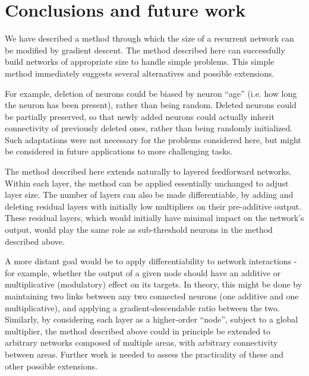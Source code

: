 \documentclass{article}
\begin{document}
\section{Conclusions and future work}

We have described a method through which the size of a recurrent network can be
modified by gradient descent. The method described here can successfully build
networks of appropriate size to handle simple problems. This simple method
immediately suggests several alternatives and possible extensions.

For example, deletion of neurons could be biased by neuron ``age'' (i.e. how
long the neuron has been present), rather than being random. Deleted neurons
could be partially preserved, so that newly added neurons could actually
inherit connectivity of previously deleted ones, rather than being randomly
initialized. Such adaptations were not necessary for the problems considered
here, but might be considered in future applications to more challenging tasks.

The method described here extends naturally to layered feedforward networks.
Within each layer, the method can be applied essentially unchanged to adjust
layer size. The number of layers can also be made differentiable, by adding and deleting
residual layers \cite{He2015-gk} with initially low multipliers on their
pre-additive output. These residual layers, which would initially have minimal impact
on the network's output, would play the same role as sub-threshold neurons in
the method described above.


A more distant goal would be to  apply differentiability to network
interactions - for example, whether the output of a given node should have an
additive or multiplicative (modulatory) effect on its targets. In theory, this
might be done by maintaining two links between any two connected neurons (one
additive and one multiplicative), and applying a gradient-descendable ratio
between the two.  Similarly, by considering each layer as a higher-order
``node'', subject to a global multiplier, the method described above could in
principle be extended to arbitrary networks composed of multiple areas, with
arbitrary connectivity between areas. Further work is needed to assess the
practicality of these and other possible extensions.


\small

\printbibliography
\end{document}
